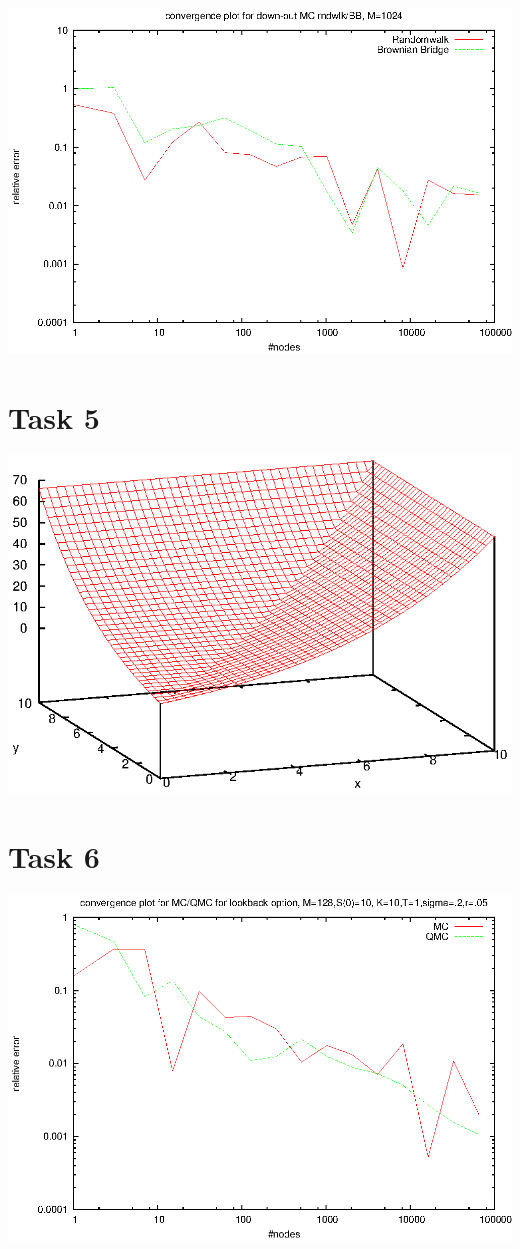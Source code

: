 \documentclass[]{article}
\begin{document}
\includegraphics[width=.9\textwidth]{task4_mc_1024.eps}\\

\section*{Task 5}
\includegraphics[width=.9\textwidth]{task5.eps}\\

\section*{Task 6}
\includegraphics[width=.9\textwidth]{task6.eps}\\
\end{document}
